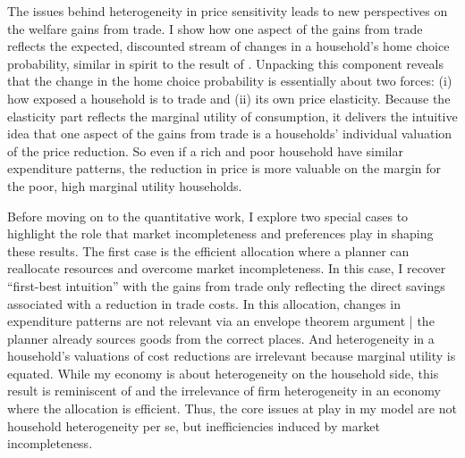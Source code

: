 \documentclass[12pt,pdftex]{article}
\begin{document}
\begin{onehalfspacing}
The issues behind heterogeneity in price sensitivity leads to new perspectives on the welfare gains from trade. I show how one aspect of the gains from trade reflects the expected, discounted stream of changes in a household's home choice probability, similar in spirit to the result of \citet*{arkolakis2012new}. Unpacking this component reveals that the change in the home choice probability is essentially about two forces: (i) how exposed a household is to trade and (ii) its own price elasticity. Because the elasticity part reflects the marginal utility of consumption, it delivers the intuitive idea that one aspect of the gains from trade is a households' individual valuation of the price reduction. So even if a rich and poor household have similar expenditure patterns, the reduction in price is more valuable on the margin for the poor, high marginal utility households.

Before moving on to the quantitative work, I explore two special cases to highlight the role that market incompleteness and preferences play in shaping these results. The first case is the efficient allocation where a planner can reallocate resources and overcome market incompleteness. In this case, I recover ``first-best intuition'' with the gains from trade only reflecting the direct savings associated with a reduction in trade costs. In this allocation, changes in expenditure patterns are not relevant via an envelope theorem argument | the planner already sources goods from the correct places. And heterogeneity in a household's valuations of cost reductions are irrelevant because marginal utility is equated. While my economy is about heterogeneity on the household side, this result is reminiscent of \citet{AtkesonBurstein2010} and the irrelevance of firm heterogeneity in an economy where the allocation is efficient. Thus, the core issues at play in my model are not household heterogeneity per se, but inefficiencies induced by market incompleteness.


\end{onehalfspacing}
\end{document}
